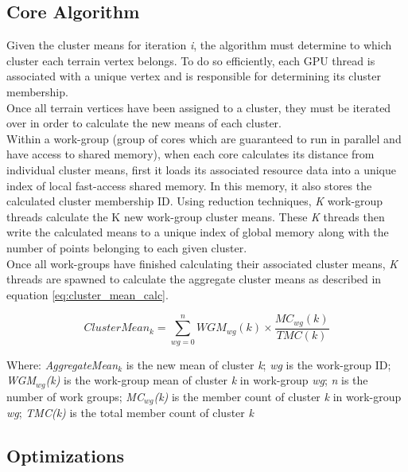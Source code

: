 \subsection{Core Algorithm}

Given the cluster means for iteration \textit{i}, the algorithm must determine to which cluster each terrain vertex belongs. To do so efficiently, each GPU thread is associated with a unique vertex and is responsible for determining its cluster membership.\\

Once all terrain vertices have been assigned to a cluster, they must be iterated over in order to calculate the new means of each cluster.\\

Within a work-group (group of cores which are guaranteed to run in parallel and have access to shared memory), when each core calculates its distance from individual cluster means, first it loads its associated resource data into a unique index of local fast-access shared memory. In this memory, it also stores the calculated cluster membership ID. Using reduction techniques, \textit{K} work-group threads calculate the K new work-group cluster means. These \textit{K} threads then write the calculated means to a unique index of global memory along with the number of points belonging to each given cluster.\\

Once all work-groups have finished calculating their associated cluster means, \textit{K} threads are spawned to calculate the aggregate cluster means as described in equation \ref{eq:cluster_mean_calc}.

\begin{equation} \label{eq:cluster_mean_calc}
ClusterMean_{k} = \sum_{wg=0}^{n} WGM_{wg}(k) \times \frac{MC_{wg}(k)}{TMC(k)}
\end{equation}

Where: \textit{AggregateMean$_{k}$} is the new mean of cluster \textit{k}; \textit{wg} is the work-group ID; \textit{WGM$_{wg}$(k)} is the work-group mean of cluster \textit{k} in work-group \textit{wg};  \textit{n} is the number of work groups; \textit{MC$_{wg}$(k)} is the member count of cluster \textit{k} in work-group \textit{wg}; \textit{TMC(k)} is the total member count of cluster \textit{k}

\subsection{Optimizations}

